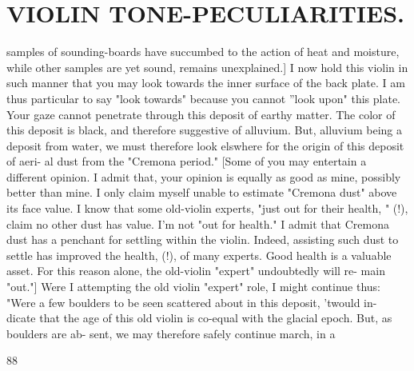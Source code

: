 \documentclass{article}
\begin{document}
\section*{VIOLIN TONE-PECULIARITIES.}
samples of sounding-boards have succumbed to the action of heat and moisture, while other samples are yet sound, remains unexplained.] I now hold this violin in such manner that you may look towards the inner surface of the back plate. I am thus particular to say "look towards" because you cannot ''look upon" this plate. Your gaze cannot penetrate through this deposit of earthy matter. The color of this deposit is black, and therefore suggestive of alluvium. But, alluvium being a deposit from water, we must therefore look elswhere for the origin of this deposit of aeri- al dust from the "Cremona period." [Some of you may entertain a different opinion. I admit that, your opinion is equally as good as mine, possibly better than mine. I only claim myself unable to estimate "Cremona dust" above its face value. I know that some old-violin experts, "just out for their health, " (!), claim no other dust has value. I'm not "out for health." I admit that Cremona dust has a penchant for settling within the violin. Indeed, assisting such dust to settle has improved the health, (!), of many experts. Good health is a valuable asset. For this reason alone, the old-violin "expert" undoubtedly will re- main "out."] Were I attempting the old violin "expert" role, I might continue thus: "Were a few boulders to be seen scattered about in this deposit, 'twould in- dicate that the age of this old violin is co-equal with the glacial epoch. But, as boulders are ab- sent, we may therefore safely continue march, in a

88
\end{document}
